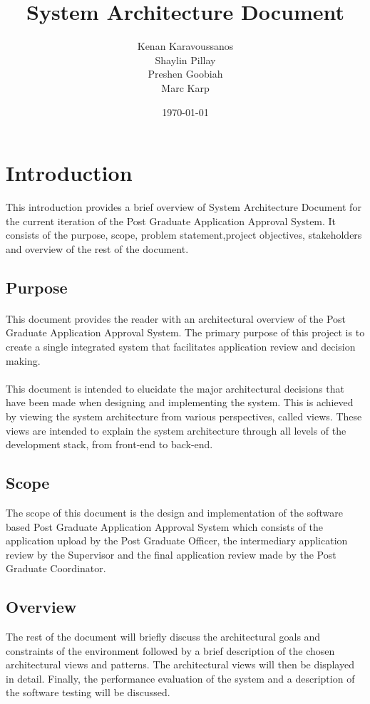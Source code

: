 \documentclass[11pt]{article}
\title{ System Architecture Document}
\author{ Kenan Karavoussanos \\ Shaylin Pillay \\ Preshen Goobiah \\ Marc Karp}
\date{\today}
\begin{document}
\maketitle
\tableofcontents

%
\newpage
\section{Introduction}
This introduction provides a brief overview of System Architecture Document for the current iteration of the Post Graduate Application Approval System. It consists of the purpose, scope, problem statement,project objectives, stakeholders and overview of the rest of the document.
\subsection{Purpose}
\paragraph{}This document provides the reader with an architectural overview of the Post Graduate Application Approval System. The primary purpose of this project is to create a single integrated system that facilitates application review and decision making.

\paragraph{}This document is intended to elucidate the major architectural decisions that have been made when designing and implementing the system. This is achieved by viewing the system architecture from various perspectives, called views. These views are intended to explain the system architecture through all levels of the development stack, from front-end to back-end.


\subsection{Scope}
The scope of this document is the design and implementation of the software based Post Graduate Application Approval System which consists of the application upload by the Post Graduate Officer, the intermediary application review by the Supervisor and the final application review made by the Post Graduate Coordinator.


\subsection{Overview}
The rest of the document will briefly discuss the architectural goals and constraints of the environment followed by a brief description of the chosen architectural views and patterns. The architectural views will then be displayed in detail. Finally, the performance evaluation of the system and a description of the software testing will be discussed.
\end{document}
